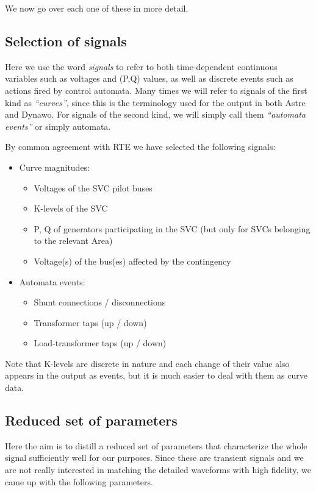 \documentclass[11pt, a4paper, twoside, titlepage]{article}
\begin{document}
We now go over each one of these in more detail.

\subsection{Selection of signals}

Here we use the word \emph{signals} to refer to both time-dependent continuous
variables such as voltages and (P,Q) values, as well as discrete events such as
actions fired by control automata.  Many times we will refer to signals of the
first kind as \emph{``curves''}, since this is the terminology used for the
output in both Astre and Dynawo. For signals of the second kind, we will simply
call them \emph{``automata events''} or simply automata.

By common agreement with RTE we have selected the following signals:
\begin{itemize}
\item Curve magnitudes:
  \begin{itemize}
  \item Voltages of the SVC pilot buses
  \item K-levels of the SVC
  \item P, Q of generators participating in the SVC (but only for SVCs belonging
    to the relevant Area)
  \item Voltage(s) of the bus(es) affected by the contingency 
  \end{itemize}
\item Automata events:
  \begin{itemize}
  \item Shunt connections / disconnections
  \item Transformer taps (up / down)
  \item Load-transformer taps (up / down)
  \end{itemize}  
\end{itemize}

Note that K-levels are discrete in nature and each change of their value also
appears in the output as events, but it is much easier to deal with them as
curve data.


\subsection{Reduced set of parameters}

Here the aim is to distill a reduced set of parameters that characterize the
whole signal sufficiently well for our purposes. Since these are transient
signals and we are not really interested in matching the detailed waveforms with
high fidelity, we came up with the following parameters.
\end{document}
